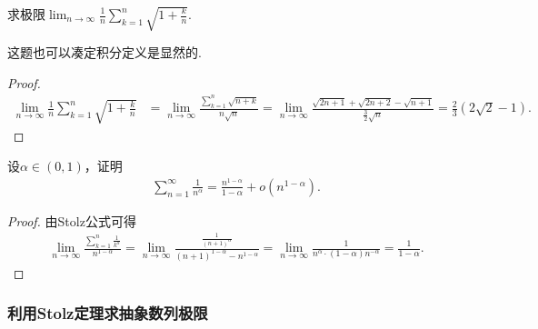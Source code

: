 \documentclass[../../main.tex]{subfiles}
\begin{document}
\begin{example}
求极限\(\lim_{n\rightarrow\infty}\frac{1}{n}\sum_{k = 1}^{n}\sqrt{1 + \frac{k}{n}}\).
\end{example}
\begin{note}
这题也可以凑定积分定义是显然的.
\end{note}
\begin{proof}
\begin{align*}
\lim_{n\rightarrow\infty}\frac{1}{n}\sum_{k = 1}^{n}\sqrt{1 + \frac{k}{n}}&=\lim_{n\rightarrow\infty}\frac{\sum\limits_{k = 1}^{n}\sqrt{n + k}}{n\sqrt{n}}=\lim_{n\rightarrow\infty}\frac{\sqrt{2n + 1}+\sqrt{2n + 2}-\sqrt{n + 1}}{\frac{3}{2}\sqrt{n}}=\frac{2}{3}(2\sqrt{2}-1).
\end{align*}

\end{proof}

\begin{proposition}\label{proposition:幂次小于1的级数的阶}
设$\alpha \in \left( 0,1 \right)$，证明
\begin{align*}
\sum_{n=1}^{\infty}{\frac{1}{n^{\alpha}}}=\frac{n^{1-\alpha}}{1-\alpha}+o\left( n^{1-\alpha} \right) .
\end{align*}
\end{proposition}
\begin{proof}
由Stolz公式可得
\begin{align*}
\lim_{n\rightarrow \infty} \frac{\sum\limits_{k=1}^n{\frac{1}{k^{\alpha}}}}{n^{1-\alpha}}=\lim_{n\rightarrow \infty} \frac{\frac{1}{\left( n+1 \right) ^{\alpha}}}{\left( n+1 \right) ^{1-\alpha}-n^{1-\alpha}}=\lim_{n\rightarrow \infty} \frac{1}{n^{\alpha}\cdot \left( 1-\alpha \right) n^{-\alpha}}=\frac{1}{1-\alpha}.
\end{align*}

\end{proof}



\subsubsection{利用Stolz定理求抽象数列极限}
\end{document}
